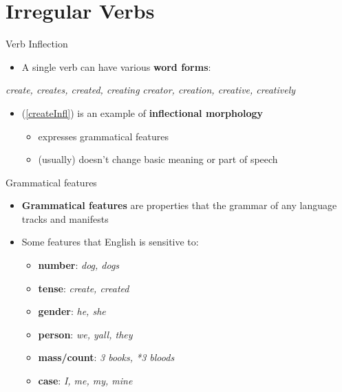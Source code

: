 \documentclass[10pt, compress]{beamer}
\begin{document}
\section{Irregular Verbs}
\begin{frame}{Verb Inflection}
	\begin{itemize}
		\item A single verb can have various {\bf word forms}:
	\end{itemize}

	\begin{exe}
			\begin{xlist}
			\ex\label{createInfl} \emph{create, creates, created, creating}
			\ex\label{createDer} \emph{creator, creation, creative, creatively}
		\end{xlist}
	\end{exe}

	\begin{itemize}
		\item (\ref{createInfl}) is an example of {\bf inflectional morphology}
		\begin{itemize}
			\item expresses grammatical features
			\item (usually) doesn't change basic meaning or part of speech
		\end{itemize}
	\end{itemize}
\end{frame}

\begin{frame}{Grammatical features}
	\begin{itemize}
		\item \textbf{Grammatical features} are properties that the grammar of any language tracks and manifests
		\item Some features that English is sensitive to:
		\begin{itemize}
			\item \textbf{number}: \emph{dog, dogs}
			\item \textbf{tense}: \emph{create, created}
			\item \textbf{gender}: \emph{he, she}
			\item \textbf{person}: \emph{we, yall, they}
			\item \textbf{mass/count}: \emph{3 books, *3 bloods}
			\item \textbf{case}: \emph{I, me, my, mine}
		\end{itemize}
	\end{itemize}
\end{frame}
\end{document}
